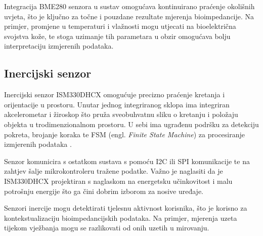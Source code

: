 \documentclass[../diplomski_rad.tex]{subfiles}
\begin{document}
Integracija BME280 senzora u sustav omogućava kontinuirano praćenje okolišnih uvjeta, 
što je ključno za točne i pouzdane rezultate mjerenja bioimpedancije. 
Na primjer, promjene u temperaturi i vlažnosti mogu utjecati na bioelektrična svojstva kože, 
te stoga uzimanje tih parametara u obzir omogućava bolju interpretaciju izmjerenih podataka.

\subsection{Inercijski senzor}

Inercijski senzor ISM330DHCX omogućuje precizno praćenje kretanja i orijentacije u prostoru.
Unutar jednog integriranog sklopa ima integriran akcelerometar i žiroskop što pruža sveobuhvatnu sliku o kretanju 
i položaju objekta u trodimenzionalnom  prostoru. U sebi ima ugrađenu podršku za detekciju pokreta, brojanje koraka te 
FSM (engl. \textit{Finite State Machine}) za procesiranje izmjerenih podataka \cite{ism330dhcx}. 

Senzor komunicira s ostatkom sustava s pomoću I2C ili SPI komunikacije te na zahtjev šalje mikrokontroleru tražene podatke.
Važno je naglasiti da je ISM330DHCX projektiran s naglaskom na energetsku učinkovitost i malu potrošnju energije 
što ga čini dobrim izborom za nosive uređaje.

Senzori inercije mogu detektirati tjelesnu aktivnost korisnika, što je korisno za kontekstualizaciju bioimpedancijskih podataka. 
Na primjer, mjerenja uzeta tijekom vježbanja mogu se razlikovati od onih uzetih u mirovanju.
\end{document}
